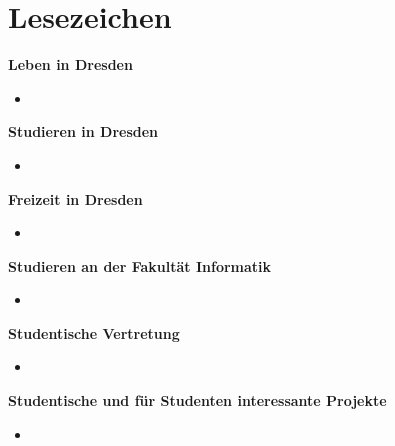 \chapter{Lesezeichen}


\textbf{Leben in Dresden}
\begin{itemize}
\item
\end{itemize}

\textbf{Studieren in Dresden}
\begin{itemize}
\item
\end{itemize}

\textbf{Freizeit in Dresden}
\begin{itemize}
\item
\end{itemize}

\textbf{Studieren an der Fakultät Informatik}
\begin{itemize}
\item
\end{itemize}

\textbf{Studentische Vertretung}
\begin{itemize}
\item
\end{itemize}

\textbf{Studentische und für Studenten interessante Projekte}
\begin{itemize}
\item
\end{itemize}

